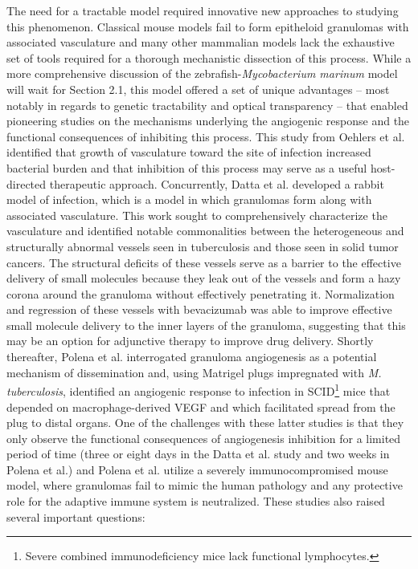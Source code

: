 The need for a tractable model required innovative new approaches to studying this phenomenon. Classical mouse models fail to form epitheloid granulomas with associated vasculature and many other mammalian models lack the exhaustive set of tools required for a thorough mechanistic dissection of this process. While a more comprehensive discussion of the zebrafish-\textit{Mycobacterium marinum} model will wait for Section 2.1, this model offered a set of unique advantages -- most notably in regards to genetic tractability and optical transparency -- that enabled pioneering studies on the mechanisms underlying the angiogenic response and the functional consequences of inhibiting this process. This study from Oehlers et al. identified that growth of vasculature toward the site of infection increased bacterial burden and that inhibition of this process may serve as a useful host-directed therapeutic approach. Concurrently, Datta et al. developed a rabbit model of infection, which is a model in which granulomas form along with associated vasculature. This work sought to comprehensively characterize the vasculature and identified notable commonalities between the heterogeneous and structurally abnormal vessels seen in tuberculosis and those seen in solid tumor cancers. The structural deficits of these vessels serve as a barrier to the effective delivery of small molecules because they leak out of the vessels and form a hazy corona around the granuloma without effectively penetrating it. Normalization and regression of these vessels with bevacizumab was able to improve effective small molecule delivery to the inner layers of the granuloma, suggesting that this may be an option for adjunctive therapy to improve drug delivery. Shortly thereafter, Polena et al. interrogated granuloma angiogenesis as a potential mechanism of dissemination and, using Matrigel plugs impregnated with \textit{M. tuberculosis}, identified an angiogenic response to infection in SCID\footnote{Severe combined immunodeficiency mice lack functional lymphocytes.} mice that depended on macrophage-derived VEGF and which facilitated spread from the plug to distal organs. One of the challenges with these latter studies is that they only observe the functional consequences of angiogenesis inhibition for a limited period of time (three or eight days in the Datta et al. study and two weeks in Polena et al.) and Polena et al. utilize a severely immunocompromised mouse model, where granulomas fail to mimic the human pathology and any protective role for the adaptive immune system is neutralized. These studies also raised several important questions:

